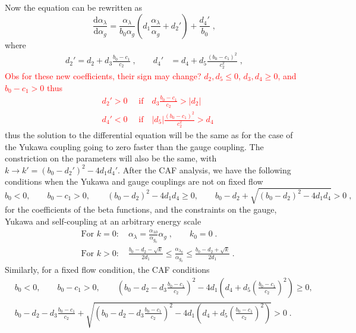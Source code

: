 Now the equation can be rewritten as
\begin{equation}
    \frac{\text{d} \alpha_\lambda}{\text{d}\alpha_g}=\frac{\alpha_\lambda}{b_0\alpha_g}\left(d_1\frac{\alpha_\lambda}{\alpha_g} + d_2'\right)+\frac{d_4'}{b_0}\;,
\end{equation}
where 
\begin{align}
    d_2'=d_2+d_3\frac{b_0-c_1}{c_2}\;,\quad\quad d_4'&={d_4}+d_5\frac{(b_0-c_1)^2}{c_2^2}\;,
\end{align}
\textcolor{red}{
Obs for these new coefficients, their sign may change? $d_2,d_5\le 0$,  $d_3,d_4\ge0$, and $b_0-c_1>0$ thus
\begin{align}
     &d_2'>0 \quad \text{  if}\quad d_3\frac{b_0-c_1}{c_2}>|d_2|
     \\&d_4'<0 \quad \text{  if}\quad |d_5|\frac{(b_0-c_1)^2}{c_2^2}>d_4
\end{align}
}
thus the solution to the differential equation will be the same as for the case of the Yukawa coupling going to zero faster than the gauge coupling. The constriction on the parameters will also be the same, with $k\to k'=(b_0-d_2')^2-4d_1d_4'$.
After the CAF analysis, we have the following conditions when the Yukawa and gauge couplings are not on fixed flow
\begin{equation}
    b_0<0,\quad\quad b_0-c_1>0,\quad\quad (b_0-d_2)^2-4d_1d_4\geq 0,\quad\quad b_0-d_2+\sqrt{(b_0-d_2)^2-4d_1d_4}>0\;,\label{eq:CAF}
\end{equation}
for the coefficients of the beta functions, and the constraints on the gauge, Yukawa and self-coupling at an arbitrary energy scale 
\begin{align}
    &\text{For }k=0: \quad \alpha_{\lambda} = \frac{ \alpha_{\lambda0}  }{ \alpha_{g_0}  } \alpha_g\;,\quad\quad k_0=0\;.\label{eq:CAFalpha}\\&
    \text{For }k>0: \quad 
    \frac{b_0-d_2-\sqrt{k}}{2d_1}\le \frac{\alpha_{\lambda_0}}{\alpha_{g_0}}\le \frac{b_0-d_2+\sqrt{k}}{2d_1}\;. \label{eq:CAFalphafixed}
\end{align}
Similarly, for a fixed flow condition, the CAF conditions 
\begin{align}
    &b_0<0,\quad\quad b_0-c_1>0,\quad\quad \left(b_0-d_2-d_3\frac{b_0-c_1}{c_2}\right)^2-4d_1\left(d_4+d_5\left(\frac{b_0-c_1}{c_2}\right)^2\right)\geq 0,\\&b_0-d_2- d_3 \frac{b_0-c_1}{c_2}+\sqrt{\left(b_0-d_2 - d_3 \frac{b_0-c_1}{c_2}\right)^2-4d_1\left(d_4+d_5\left(\frac{b_0-c_1}{c_2}\right)^2\right)}>0\;.\label{eq:CAFfixed}
\end{align}  

